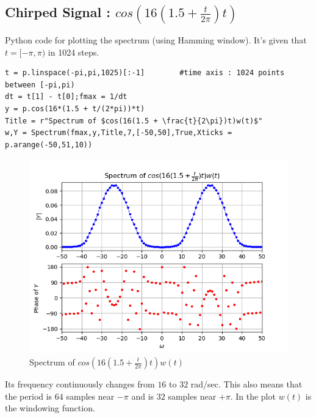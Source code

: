 \documentclass[11pt, a4paper]{article}
\begin{document}
    \subsection{Chirped Signal : $cos(16(1.5 + \frac{t}{2\pi})t)$}
    Python code for plotting the spectrum (using Hamming window). It's given that $t = [-\pi,\pi)$ in 1024 steps.
        \begin{verbatim}
t = p.linspace(-pi,pi,1025)[:-1]        #time axis : 1024 points between [-pi,pi)
dt = t[1] - t[0];fmax = 1/dt
y = p.cos(16*(1.5 + t/(2*pi))*t)
Title = r"Spectrum of $cos(16(1.5 + \frac{t}{2\pi})t)w(t)$"
w,Y = Spectrum(fmax,y,Title,7,[-50,50],True,Xticks = p.arange(-50,51,10))
        \end{verbatim}
        \begin{figure}[!h]
            \centering
            \includegraphics[scale = 0.65]{Figure 7.png}
            \caption{Spectrum of $cos(16(1.5 + \frac{t}{2\pi})t)w(t)$}
            \label{fig:Figure 7}
        \end{figure}
    Its frequency continuously changes from $16$ to $32$ rad/sec. This also means
    that the period is $64$ samples near $-\pi$ and is $32$ samples near $+\pi$. In the plot $w(t)$ is the windowing function.
    
\end{document}
